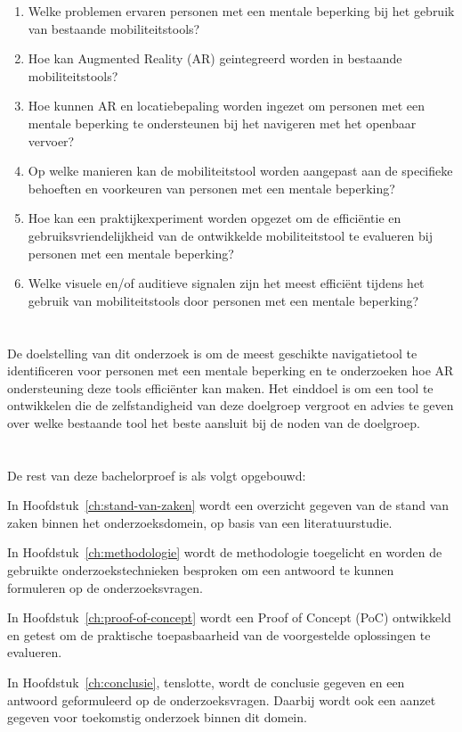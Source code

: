 \begin{enumerate}
    \item Welke problemen ervaren personen met een mentale beperking bij het gebruik van bestaande mobiliteitstools?
    \item Hoe kan Augmented Reality (AR) geintegreerd worden in bestaande mobiliteitstools?
    \item Hoe kunnen AR en locatiebepaling worden ingezet om personen met een mentale beperking te ondersteunen bij het navigeren met het openbaar vervoer?
    \item Op welke manieren kan de mobiliteitstool worden aangepast aan de specifieke behoeften en voorkeuren van personen met een mentale beperking?
    \item Hoe kan een praktijkexperiment worden opgezet om de efficiëntie en gebruiksvriendelijkheid van de ontwikkelde mobiliteitstool te evalueren bij personen met een mentale beperking?
    \item Welke visuele en/of auditieve signalen zijn het meest efficiënt tijdens het gebruik van mobiliteitstools door personen met een mentale beperking?
\end{enumerate}

\section{}%
\label{sec:onderzoeksdoelstelling}

De doelstelling van dit onderzoek is om de meest geschikte navigatietool te identificeren voor personen met een mentale beperking en te onderzoeken hoe AR ondersteuning deze tools efficiënter kan maken. Het einddoel is om een tool te ontwikkelen die de zelfstandigheid van deze doelgroep vergroot en advies te geven over welke bestaande tool het beste aansluit bij de noden van de doelgroep.

\section{}%
\label{sec:opzet-bachelorproef}

De rest van deze bachelorproef is als volgt opgebouwd:

In Hoofdstuk~\ref{ch:stand-van-zaken} wordt een overzicht gegeven van de stand van zaken binnen het onderzoeksdomein, op basis van een literatuurstudie.

In Hoofdstuk~\ref{ch:methodologie} wordt de methodologie toegelicht en worden de gebruikte onderzoekstechnieken besproken om een antwoord te kunnen formuleren op de onderzoeksvragen.

In Hoofdstuk~\ref{ch:proof-of-concept} wordt een Proof of Concept (PoC) ontwikkeld en getest om de praktische toepasbaarheid van de voorgestelde oplossingen te evalueren.

In Hoofdstuk~\ref{ch:conclusie}, tenslotte, wordt de conclusie gegeven en een antwoord geformuleerd op de onderzoeksvragen. Daarbij wordt ook een aanzet gegeven voor toekomstig onderzoek binnen dit domein.
